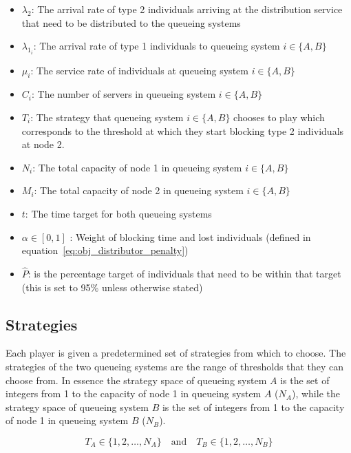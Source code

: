 \begin{itemize}
    \item \(\lambda_2\): The arrival rate of type 2 individuals arriving at the
    distribution service that need to be distributed to the queueing systems
    \item \(\lambda_{1_i}\): The arrival rate of type 1 individuals to queueing
    system \(i\in\{A, B\}\)
    \item \(\mu_i\): The service rate of individuals at queueing system
    \(i\in\{A, B\}\)
    \item \(C_i\): The number of servers in queueing system \(i\in\{A, B\}\)
    \item \(T_i\): The strategy that queueing system \(i\in\{A, B\} \) chooses
    to play which corresponds to the threshold at which they start blocking
    type 2 individuals at node 2.
    \item \(N_i\): The total capacity of node 1 in queueing system
    \(i\in\{A, B\}\)
    \item \(M_i\): The total capacity of node 2 in queueing system
    \(i\in\{A, B\}\)
    \item \(t\): The time target for both queueing systems
    \item \(\alpha \in [0, 1]\) : Weight of blocking time and
    lost individuals (defined in equation~\eqref{eq:obj_distributor_penalty})
    \item \(\hat{P}\): is the percentage target of individuals that need to be
    within that target (this is set to 95\% unless otherwise stated)
\end{itemize}

\subsection{Strategies}\label{sec:game_strategies}

Each player is given a predetermined set of strategies from which to choose.
The strategies of the two queueing systems are the range of thresholds that they
can choose from.
In essence the strategy space of queueing system \(A\) is the set of integers
from
1 to the capacity of node 1 in queueing system \(A\) (\(N_A\)), while the
strategy space of queueing system \(B\) is the set of integers from 1 to the
capacity of node 1 in queueing system \(B\) (\(N_B\)).

\begin{equation}\label{eq:game_strategy_space_queueing_systems}
    T_A \in \{1, 2, \ldots, N_A\} \quad \text{and} \quad
    T_B \in \{1, 2, \ldots, N_B\}
\end{equation}

